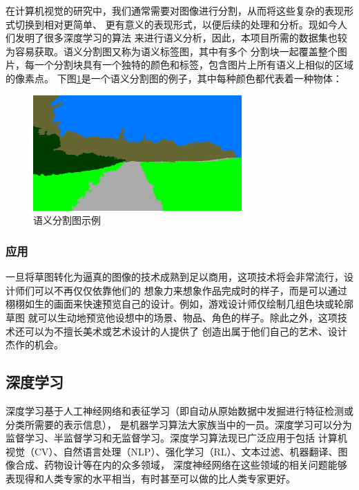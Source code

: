 \documentclass[supercite]{HustGraduPaper}
\theoremstyle{definition}
\begin{document}
在计算机视觉的研究中，我们通常需要对图像进行分割，从而将这些复杂的表现形式切换到相对更简单、
更有意义的表现形式，以便后续的处理和分析\cite{wikipedia}。现如今人们发明了很多深度学习的算法
来进行语义分析，因此，本项目所需的数据集也较为容易获取。语义分割图又称为语义标签图，其中有多个
分割块一起覆盖整个图片，每一个分割块具有一个独特的颜色和标签，包含图片上所有语义上相似的区域的像素点。
下图\ref{fig:segmentation-map-example}是一个语义分割图的例子，其中每种颜色都代表着一种物体：
\begin{figure}[H]
  \begin{center}
  \includegraphics[width=8cm]{images/seg-map-eg}
  \end{center}
  \caption{语义分割图示例}
  \label{fig:segmentation-map-example}
\end{figure}

\subsubsection{应用}

一旦将草图转化为逼真的图像的技术成熟到足以商用，这项技术将会非常流行，设计师们可以不再仅仅依靠他们的
想象力来想象作品完成时的样子，而是可以通过栩栩如生的画面来快速预览自己的设计。例如，游戏设计师仅绘制几组色块或轮廓草图
就可以生动地预览他设想中的场景、物品、角色的样子。除此之外，这项技术还可以为不擅长美术或艺术设计的人提供了
创造出属于他们自己的艺术、设计杰作的机会。

\subsection{深度学习}

深度学习基于人工神经网络和表征学习（即自动从原始数据中发掘进行特征检测或分类所需要的表示信息\cite{wikipedia}），
是机器学习算法大家族当中的一员。深度学习可以分为监督学习、半监督学习和无监督学习。深度学习算法现已广泛应用于包括
计算机视觉（CV）、自然语言处理（NLP）、强化学习（RL）、文本过滤、机器翻译、图像合成、药物设计等在内的众多领域，
深度神经网络在这些领域的相关问题能够表现得和人类专家的水平相当，有时甚至可以做的比人类专家更好。
\end{document}
